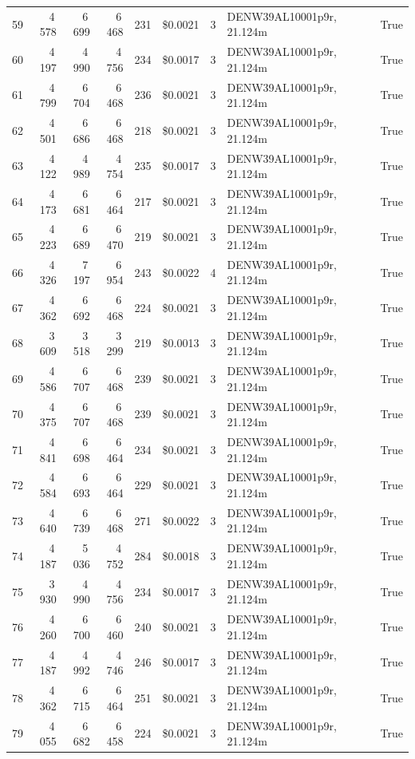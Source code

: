 \documentclass[a4paper,11pt]{article}
\begin{document}
\begin{table}[ht]
\begin{tabular}{r r r r r r r p{3cm} l}
59 & 4\,578 & 6\,699 & 6\,468 & 231 & \$0.0021 & 3 & DENW39AL10001p9r, 21.124m & True \\
60 & 4\,197 & 4\,990 & 4\,756 & 234 & \$0.0017 & 3 & DENW39AL10001p9r, 21.124m & True \\
61 & 4\,799 & 6\,704 & 6\,468 & 236 & \$0.0021 & 3 & DENW39AL10001p9r, 21.124m & True \\
62 & 4\,501 & 6\,686 & 6\,468 & 218 & \$0.0021 & 3 & DENW39AL10001p9r, 21.124m & True \\
63 & 4\,122 & 4\,989 & 4\,754 & 235 & \$0.0017 & 3 & DENW39AL10001p9r, 21.124m & True \\
64 & 4\,173 & 6\,681 & 6\,464 & 217 & \$0.0021 & 3 & DENW39AL10001p9r, 21.124m & True \\
65 & 4\,223 & 6\,689 & 6\,470 & 219 & \$0.0021 & 3 & DENW39AL10001p9r, 21.124m & True \\
66 & 4\,326 & 7\,197 & 6\,954 & 243 & \$0.0022 & 4 & DENW39AL10001p9r, 21.124m & True \\
67 & 4\,362 & 6\,692 & 6\,468 & 224 & \$0.0021 & 3 & DENW39AL10001p9r, 21.124m & True \\
68 & 3\,609 & 3\,518 & 3\,299 & 219 & \$0.0013 & 3 & DENW39AL10001p9r, 21.124m & True \\
69 & 4\,586 & 6\,707 & 6\,468 & 239 & \$0.0021 & 3 & DENW39AL10001p9r, 21.124m & True \\
70 & 4\,375 & 6\,707 & 6\,468 & 239 & \$0.0021 & 3 & DENW39AL10001p9r, 21.124m & True \\
71 & 4\,841 & 6\,698 & 6\,464 & 234 & \$0.0021 & 3 & DENW39AL10001p9r, 21.124m & True \\
72 & 4\,584 & 6\,693 & 6\,464 & 229 & \$0.0021 & 3 & DENW39AL10001p9r, 21.124m & True \\
73 & 4\,640 & 6\,739 & 6\,468 & 271 & \$0.0022 & 3 & DENW39AL10001p9r, 21.124m & True \\
74 & 4\,187 & 5\,036 & 4\,752 & 284 & \$0.0018 & 3 & DENW39AL10001p9r, 21.124m & True \\
75 & 3\,930 & 4\,990 & 4\,756 & 234 & \$0.0017 & 3 & DENW39AL10001p9r, 21.124m & True \\
76 & 4\,260 & 6\,700 & 6\,460 & 240 & \$0.0021 & 3 & DENW39AL10001p9r, 21.124m & True \\
77 & 4\,187 & 4\,992 & 4\,746 & 246 & \$0.0017 & 3 & DENW39AL10001p9r, 21.124m & True \\
78 & 4\,362 & 6\,715 & 6\,464 & 251 & \$0.0021 & 3 & DENW39AL10001p9r, 21.124m & True \\
79 & 4\,055 & 6\,682 & 6\,458 & 224 & \$0.0021 & 3 & DENW39AL10001p9r, 21.124m & True \\

\end{tabular}
\end{table}
\end{document}

